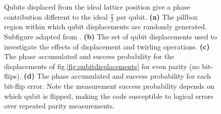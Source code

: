 \begin{figure}
	\caption{Qubits displaced from the ideal lattice position give a phase contribution different to the ideal $\tfrac{\pi}{2}$ per qubit. \textbf{(a)} The pillbox region within which qubit displacements are randomly generated. Subfigure adapted from \cite{OGorman2016}. \textbf{(b)} The set of qubit displacements used to investigate the effects of displacement and twirling operations. \textbf{(c)} The phase accumulated and success probability for the displacements of fig.\@ \ref{fig:qubitdisplacements} for even parity (no bit-flips). \textbf{(d)} The phase accumulated and success probability for each bit-flip error. Note the measurement success probability depends on which qubit is flipped, making the code susceptible to logical errors over repeated parity measurements.}
\end{figure}





